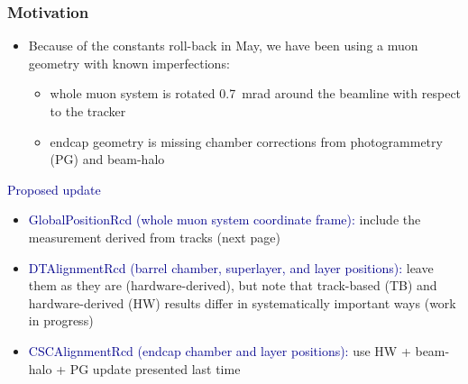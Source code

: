 \documentclass[compress]{beamer}
\begin{document}
\begin{frame}
\frametitle{Motivation}
\begin{itemize}
\item Because of the constants roll-back in May, we have been using a
  muon geometry with known imperfections:
\begin{itemize}
\item whole muon system is rotated 0.7~mrad around the beamline with
  respect to the tracker
\item endcap geometry is missing chamber corrections from
  photogrammetry (PG) and beam-halo
\end{itemize}
\end{itemize}

\vfill
\hspace{-0.83 cm} \textcolor{darkblue}{\Large Proposed update}

\begin{itemize}\setlength{\itemsep}{0.25 cm}
\item \textcolor{darkblue}{GlobalPositionRcd (whole muon system coordinate frame):} include
  the measurement derived from tracks (next page)
\item \textcolor{darkblue}{DTAlignmentRcd (barrel chamber, superlayer, and layer
  positions):} leave them as they are (hardware-derived), but note that
  track-based (TB) and hardware-derived (HW) results differ in
  systematically important ways (work in progress)
\item \textcolor{darkblue}{CSCAlignmentRcd (endcap chamber and layer positions):} use HW +
  beam-halo + PG update presented last time
\end{itemize}
\end{frame}
\end{document}

